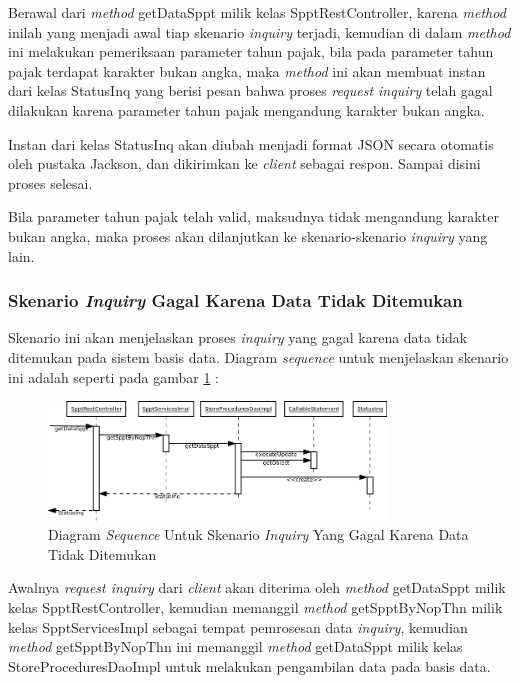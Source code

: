 \documentclass[pdftex,12pt, oneside]{article}
\begin{document}
Berawal dari \textit{method} getDataSppt milik kelas SpptRestController, karena \textit{method} inilah yang menjadi awal tiap skenario \textit{inquiry} terjadi, kemudian di dalam \textit{method} ini melakukan pemeriksaan parameter tahun pajak, bila pada parameter tahun pajak terdapat karakter bukan angka, maka \textit{method} ini akan membuat instan dari kelas StatusInq yang berisi pesan bahwa proses \textit{request inquiry} telah gagal dilakukan karena parameter tahun pajak mengandung karakter bukan angka. 

Instan dari kelas StatusInq akan diubah menjadi format JSON secara otomatis oleh pustaka Jackson, dan dikirimkan ke \textit{client} sebagai respon. Sampai disini proses selesai.

Bila parameter tahun pajak telah valid, maksudnya tidak mengandung karakter bukan angka, maka proses akan dilanjutkan ke skenario-skenario \textit{inquiry} yang lain.

\subsubsection{Skenario \textit{Inquiry} Gagal Karena Data Tidak Ditemukan}

Skenario ini akan menjelaskan proses \textit{inquiry} yang gagal karena data tidak ditemukan pada sistem basis data. Diagram \textit{sequence} untuk menjelaskan skenario ini adalah seperti pada gambar \ref{fig:uml-seq-inq-not-any} :

\begin{figure}[H]
  \centering
  \includegraphics[width=0.8\textwidth]{./resources/diagram/uml-seq-inq-not-any}
  \caption{Diagram \textit{Sequence} Untuk Skenario \textit{Inquiry} Yang Gagal Karena Data Tidak Ditemukan}
  \label{fig:uml-seq-inq-not-any}
\end{figure}

Awalnya \textit{request inquiry} dari \textit{client} akan diterima oleh \textit{method} getDataSppt milik kelas SpptRestController, kemudian memanggil \textit{method} getSpptByNopThn milik kelas SpptServicesImpl sebagai tempat pemrosesan data \textit{inquiry}, kemudian \textit{method} getSpptByNopThn ini memanggil \textit{method} getDataSppt milik kelas StoreProceduresDaoImpl untuk melakukan pengambilan data pada basis data.
\end{document}

